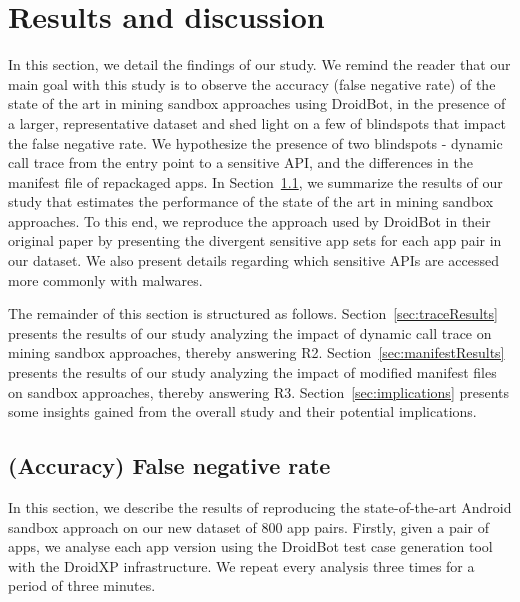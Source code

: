 \section{Results and discussion}\label{sec:results}



In this section, we detail the findings of our study.  We remind the reader that our main goal with this study is to observe the accuracy (false negative rate) of the state of the art in mining sandbox approaches using DroidBot, in the presence of a larger, representative dataset and shed light on a few of blindspots that impact the false negative rate. We hypothesize the presence of two blindspots - dynamic call trace from the entry point to a sensitive API, and the differences in the manifest file of repackaged apps. In Section~\ref{sec:Sensitive APIs}, we summarize the results of our study that estimates the performance of the state of the art in mining sandbox approaches. To this end, we reproduce the approach used by DroidBot in their original paper by presenting the divergent sensitive app sets for each app pair in our dataset. We also present details regarding which sensitive APIs are accessed more commonly with malwares. 

The remainder of this section is structured as follows. Section~\ref{sec:traceResults} presents the results of our study analyzing the impact of dynamic call trace on mining sandbox approaches, thereby answering R2. Section~\ref{sec:manifestResults} presents the results of our study analyzing the impact of modified manifest files on sandbox approaches, thereby answering R3. Section~\ref{sec:implications} presents some insights gained from the overall study and their potential implications.

\subsection{(Accuracy) False negative rate}\label{sec:Sensitive APIs}

In this section, we describe the results of reproducing the state-of-the-art Android sandbox approach on our new dataset of $800$ app pairs.
Firstly, given a pair of apps, we analyse each app version using the DroidBot test case generation tool with the DroidXP infrastructure. We repeat
every analysis three times for a period of three minutes.

